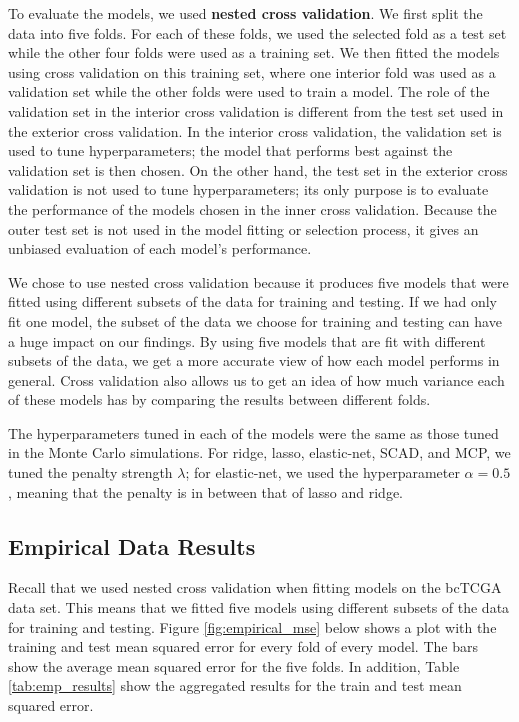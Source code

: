 \documentclass{article}
\begin{document}
	To evaluate the models, we used \textbf{nested cross validation}. We first split the data into five folds. For each of these folds, we used the selected fold as a test set while the other four folds were used as a training set. We then fitted the models using cross validation on this training set, where one interior fold was used as a validation set while the other folds were used to train a model. The role of the validation set in the interior cross validation is different from the test set used in the exterior cross validation. In the interior cross validation, the validation set is used to tune hyperparameters; the model that performs best against the validation set is then chosen. On the other hand, the test set in the exterior cross validation is not used to tune hyperparameters; its only purpose is to evaluate the performance of the models chosen in the inner cross validation. Because the outer test set is not used in the model fitting or selection process, it gives an unbiased evaluation of each model's performance.
	
	We chose to use nested cross validation because it produces five models that were fitted using different subsets of the data for training and testing. If we had only fit one model, the subset of the data we choose for training and testing can have a huge impact on our findings. By using five models that are fit with different subsets of the data, we get a more accurate view of how each model performs in general. Cross validation also allows us to get an idea of how much variance each of these models has by comparing the results between different folds.
	
	The hyperparameters tuned in each of the models were the same as those tuned in the Monte Carlo simulations. For ridge, lasso, elastic-net, SCAD, and MCP, we tuned the penalty strength $\lambda$; for elastic-net, we used the hyperparameter $\alpha = 0.5$, meaning that the penalty is in between that of lasso and ridge. 
	
	\subsection{Empirical Data Results}
	Recall that we used nested cross validation when fitting models on the bcTCGA data set. This means that we fitted five models using different subsets of the data for training and testing. Figure \ref{fig:empirical_mse} below shows a plot with the training and test mean squared error for every fold of every model. The bars show the average mean squared error for the five folds. In addition, Table \ref{tab:emp_results} show the aggregated results for the train and test mean squared error.
	
\end{document}
